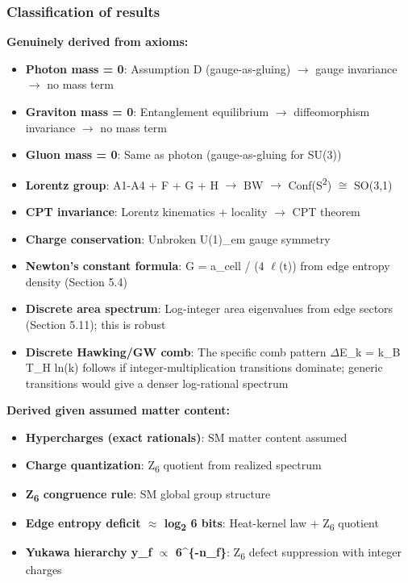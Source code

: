 \documentclass[11pt,a4paper]{article}
\theoremstyle{remark}
\providecommand{\tightlist}{%
  \setlength{\itemsep}{0pt}\setlength{\parskip}{0pt}}
\begin{document}
\subsubsection{Classification of results}\label{classification-of-results}

\textbf{Genuinely derived from axioms:}

\begin{itemize}
\tightlist
\item
  \textbf{Photon mass = 0}: Assumption D (gauge-as-gluing) \ensuremath{\to} gauge invariance \ensuremath{\to} no mass term
\item
  \textbf{Graviton mass = 0}: Entanglement equilibrium \ensuremath{\to} diffeomorphism invariance \ensuremath{\to} no mass term
\item
  \textbf{Gluon mass = 0}: Same as photon (gauge-as-gluing for SU(3))
\item
  \textbf{Lorentz group}: A1-A4 + F + G + H \ensuremath{\to} BW \ensuremath{\to} Conf(S\textsuperscript{2}) \ensuremath{\cong} SO(3,1)
\item
  \textbf{CPT invariance}: Lorentz kinematics + locality \ensuremath{\to} CPT theorem
\item
  \textbf{Charge conservation}: Unbroken U(1)\_em gauge symmetry
\item
  \textbf{Newton's constant formula}: G = a\_cell / (4 \ensuremath{\ell}(t)) from edge entropy density (Section 5.4)
\item
  \textbf{Discrete area spectrum}: Log-integer area eigenvalues from edge sectors (Section 5.11); this is robust
\item
  \textbf{Discrete Hawking/GW comb}: The specific comb pattern \ensuremath{\Delta}E\_k = k\_B T\_H ln(k) follows if integer-multiplication transitions dominate; generic transitions would give a denser log-rational spectrum
\end{itemize}

\textbf{Derived given assumed matter content:}

\begin{itemize}
\tightlist
\item
  \textbf{Hypercharges (exact rationals)}: SM matter content assumed
\item
  \textbf{Charge quantization}: Z\textsubscript{6} quotient from realized spectrum
\item
  \textbf{Z\textsubscript{6} congruence rule}: SM global group structure
\item
  \textbf{Edge entropy deficit \ensuremath{\approx} log\textsubscript{2} 6 bits}: Heat-kernel law + Z\textsubscript{6} quotient
\item
  \textbf{Yukawa hierarchy y\_f \ensuremath{\propto} 6\^{}\{-n\_f\}}: Z\textsubscript{6} defect suppression with integer charges
\end{itemize}
\end{document}
